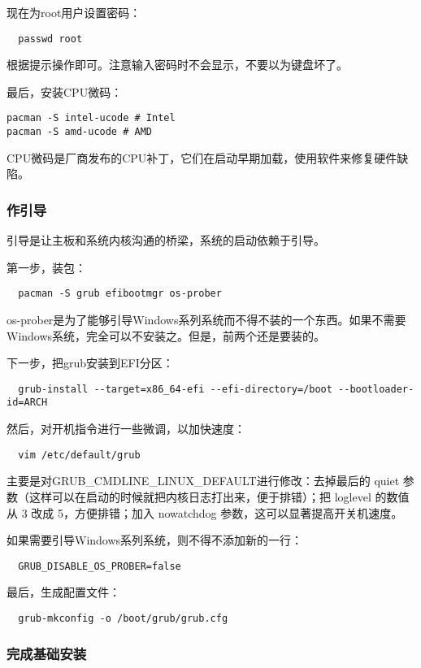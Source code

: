 现在为root用户设置密码：
\begin{lstlisting}
  passwd root
\end{lstlisting}
根据提示操作即可。注意输入密码时不会显示，不要以为键盘坏了。

最后，安装CPU微码：
\begin{lstlisting}
pacman -S intel-ucode # Intel
pacman -S amd-ucode # AMD
\end{lstlisting}
CPU微码是厂商发布的CPU补丁，它们在启动早期加载，使用软件来修复硬件缺陷。

\subsubsection{作引导}

引导是让主板和系统内核沟通的桥梁，系统的启动依赖于引导。

第一步，装包：
\begin{lstlisting}
  pacman -S grub efibootmgr os-prober
\end{lstlisting}
os-prober是为了能够引导Windows系列系统而不得不装的一个东西。如果不需要Windows系统，完全可以不安装之。但是，前两个还是要装的。

下一步，把grub安装到EFI分区：
\begin{lstlisting}
  grub-install --target=x86_64-efi --efi-directory=/boot --bootloader-id=ARCH
\end{lstlisting}

然后，对开机指令进行一些微调，以加快速度：
\begin{lstlisting}
  vim /etc/default/grub
\end{lstlisting}
主要是对GRUB\_CMDLINE\_LINUX\_DEFAULT进行修改：去掉最后的 quiet 参数（这样可以在启动的时候就把内核日志打出来，便于排错）；把 loglevel 的数值从 3 改成 5，方便排错；加入 nowatchdog 参数，这可以显著提高开关机速度。

如果需要引导Windows系列系统，则不得不添加新的一行：
\begin{lstlisting}
  GRUB_DISABLE_OS_PROBER=false
\end{lstlisting}

最后，生成配置文件：
\begin{lstlisting}
  grub-mkconfig -o /boot/grub/grub.cfg
\end{lstlisting}

\subsubsection{完成基础安装}


